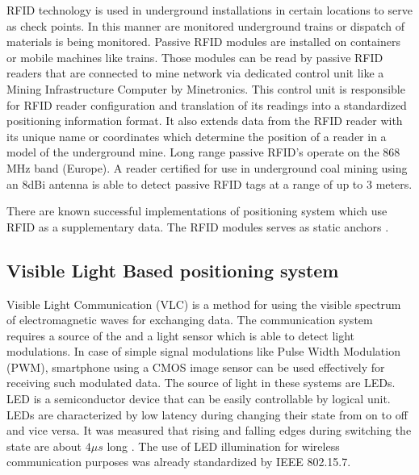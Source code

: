 \documentclass[../main.tex]{subfiles}
\begin{document}
RFID technology is used in underground installations in certain locations to serve as check points. In this manner are monitored underground trains or dispatch of materials is being monitored. Passive RFID modules are installed on containers or mobile machines like trains. Those modules can be read by passive RFID readers that are connected to mine network via dedicated control unit like a Mining Infrastructure Computer by Minetronics\cite{Thesis_CM}. This control unit is responsible for RFID reader configuration and translation of its readings into a standardized positioning information format. It also extends data from the RFID reader with its unique name or coordinates which determine the position of a reader in a model of the underground mine. Long range passive RFID's operate on the 868 MHz band (Europe). A reader certified for use in underground coal mining using an 8dBi antenna is able to detect passive RFID tags at a range of up to 3 meters\cite{Thesis_CM}.

There are known successful implementations of positioning system which use RFID as a supplementary data. The RFID modules serves as static anchors \cite{article_rfid_imu_safety_nav}\cite{thesis_smartphone_inertial_plus_rfid}.


\subsection{Visible Light Based positioning system} %
\label{sub:visible_light_based_positioning_system}


Visible Light Communication (VLC) is a method for using the visible spectrum of electromagnetic waves for exchanging data\cite{visible_light_positioning}. The communication system requires a source of the and a light sensor which is able to detect light modulations. In case of simple signal modulations like Pulse Width Modulation (PWM), smartphone using a CMOS image sensor can be used effectively for receiving such modulated data. The source of light in these systems are LEDs. LED is a semiconductor device that can be easily controllable by logical unit. LEDs are characterized by low latency during changing their state from on to off and vice versa. It was measured that rising and falling edges during switching the state are about $4 \mu s$ long \cite{visible_light_positioning_epsilon}. The use of LED illumination for wireless communication purposes was already standardized by IEEE 802.15.7.
\end{document}
